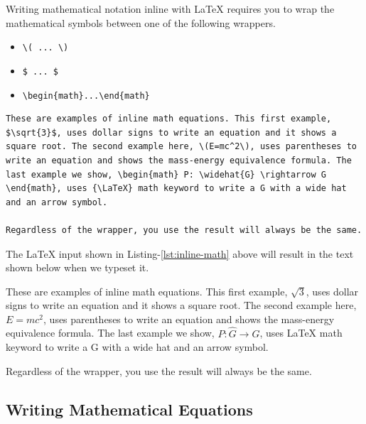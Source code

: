 Writing mathematical notation inline with {\LaTeX} requires you to wrap the mathematical symbols between one of the following wrappers.

\begin{itemize}
    \item \verb|\( ... \)|
    \item \verb|$ ... $|
    \item \verb|\begin{math}...\end{math}|
\end{itemize}


\begin{lstlisting}[language=Tex,style=mystyle,caption={Sample Paragraph with Inline Math Equations},label={lst:inline-math}]
These are examples of inline math equations. This first example, $\sqrt{3}$, uses dollar signs to write an equation and it shows a square root. The second example here, \(E=mc^2\), uses parentheses to write an equation and shows the mass-energy equivalence formula. The last example we show, \begin{math} P: \widehat{G} \rightarrow G \end{math}, uses {\LaTeX} math keyword to write a G with a wide hat and an arrow symbol. 

Regardless of the wrapper, you use the result will always be the same.
\end{lstlisting}

The {\LaTeX} input shown in Listing-\ref{lst:inline-math} above will result in the text shown below when we typeset it.

These are examples of inline math equations. This first example, $\sqrt{3}$, uses dollar signs to write an equation and it shows a square root. The second example here, \(E=mc^2\), uses parentheses to write an equation and shows the mass-energy equivalence formula. The last example we show, \begin{math} P: \widehat{G} \rightarrow G \end{math}, uses {\LaTeX} math keyword to write a G with a wide hat and an arrow symbol. 

Regardless of the wrapper, you use the result will always be the same.

\subsection{Writing Mathematical Equations}
\label{sub:writing_mathematical_equations}

